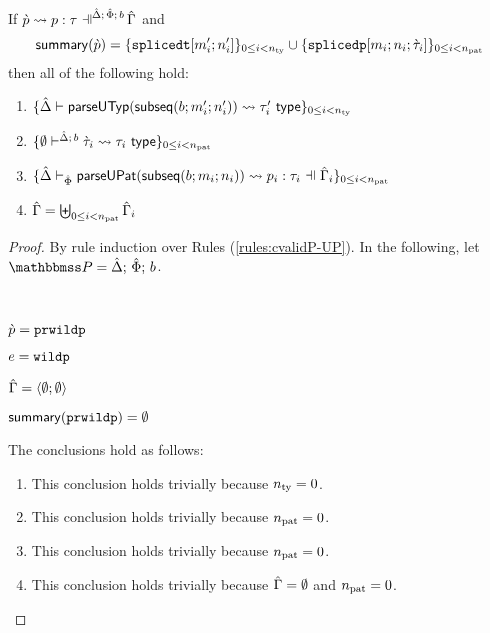\begin{grayparbox}
\begin{lemma}
\label{lemma:proto-pattern-expansion-decomposition-S}
If $\cvalidP{\upctx}{\pscene{\uDelta}{\uPhi}{b}}{\cpv}{p}{\tau}$ and 
\[ 
\mathsf{summary}(\grave{p}) = \{\texttt{splicedt}[m'_i; n'_i]\}_{0 \leq i < n_\text{ty}} \cup \{\texttt{splicedp}[m_i; n_i; \grave{\tau}_i]\}_{0 \leq i < n_\text{pat}}
\]
then all of the following hold:
\begin{enumerate}
    \item $\{
          \hat{\Delta} \vdash 
            \mathsf{parseUTyp}(\mathsf{subseq}(b; m'_i; n'_i))
           \leadsto \tau'_i~\mathsf{type}
        \}_{0 \leq i < n_\text{ty}}$
    \item $\{
      \emptyset\vdash^{
        \hat{\Delta};\,b
      } 
        \grave{\tau}_i
       \leadsto \tau_i~\mathsf{type}
    \}_{0 \leq i < n_\text{pat}}$
    \item $\sseq{
      \patExpands
        {\upctx_i}
        {\uPhi}
        {\parseUPatF{\bsubseq{b}{m_i}{n_i}}}
        {p_i}
        {\tau_i}
    }{\npat}$
  \item $\hat\Gamma = \biguplus_{0 \leq i < n_\text{pat}} \hat\Gamma_i$
\end{enumerate}
\end{lemma}
\begin{proof} By rule induction over Rules (\ref{rules:cvalidP-UP}). In the following, let $\pscenev=\pscene{\uDelta}{\uPhi}{b}$.
\begin{byCases}
  \item[\text{(\ref{rule:cvalidP-UP-wild})}] ~
    \begin{pfsteps*}
      \item $\grave{p}=\texttt{prwildp}$ 
      \item $e = \texttt{wildp}$ 
      \item $\hat\Gamma = \langle \emptyset; \emptyset \rangle$ 
      \item $\mathsf{summary}(\texttt{prwildp}) = \emptyset$ 
    \end{pfsteps*}
    The conclusions hold as follows:
    \begin{enumerate}
      \item This conclusion holds trivially because $n_\text{ty}=0$.
      \item This conclusion holds trivially because $n_\text{pat}=0$.
      \item This conclusion holds trivially because $n_\text{pat}=0$.
      \item This conclusion holds trivially because $\hat\Gamma=\emptyset$ and $n_\text{pat}=0$.
    \end{enumerate}

\end{byCases}
\end{proof}
\end{grayparbox}
